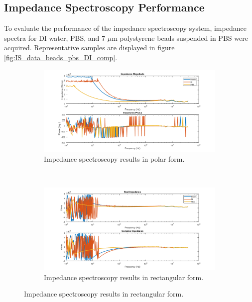 \clearpage

\subsection{Impedance Spectroscopy Performance}



\par To evaluate the performance of the impedance spectroscopy system, impedance spectra for DI water, PBS, and 7 $\mu$m polystyrene beads suspended in PBS were acquired. Representative samples are displayed in figure \ref{fig:IS_data_beads_pbs_DI_comp}. 

\begin{figure}[h]
    \centering
    \begin{subfigure}[b]{0.9\textwidth}
        \centering
        \includegraphics[width=\textwidth]{images/raw_IS_data_mag_phase.png}
        \caption{Impedance spectroscopy results in polar form.}
    \end{subfigure}
    \\
    \vspace{0.1 in}
    \begin{subfigure}[b]{0.9\textwidth}
        \centering
        \includegraphics[width=\textwidth]{images/raw_IS_data_real_imag.png}
        \caption{Impedance spectroscopy results in rectangular form.}

\end{subfigure}
\end{figure}

